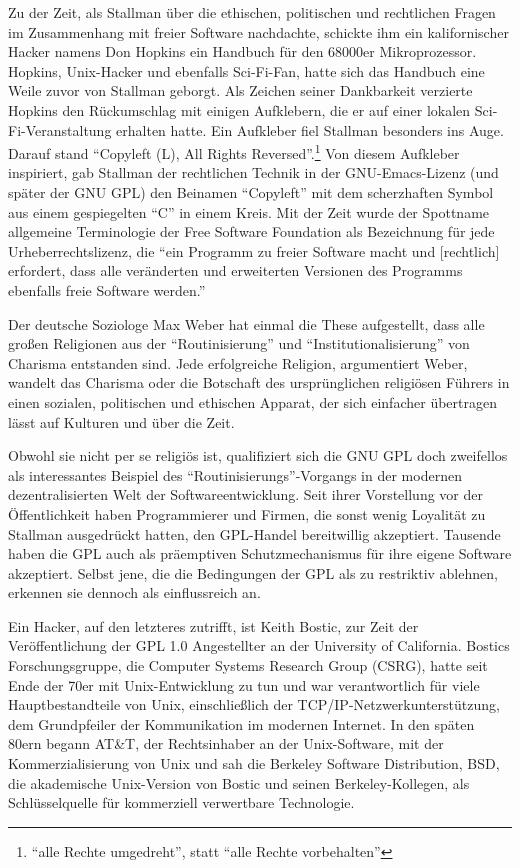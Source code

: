 Zu der Zeit, als Stallman über die ethischen, politischen und rechtlichen Fragen im Zusammenhang mit freier Software nachdachte, schickte ihm ein kalifornischer Hacker namens Don Hopkins ein Handbuch für den 68000er Mikroprozessor. Hopkins, Unix-Hacker und ebenfalls Sci-Fi-Fan, hatte sich das Handbuch eine Weile zuvor von Stallman geborgt. Als Zeichen seiner Dankbarkeit verzierte Hopkins den Rückumschlag mit einigen Aufklebern, die er auf einer lokalen Sci-Fi-Veranstaltung erhalten hatte. Ein Aufkleber fiel Stallman besonders ins Auge. Darauf stand "`Copyleft (L), All Rights Reversed"'.\footnote{"`alle Rechte umgedreht"', statt "`alle Rechte vorbehalten"'} Von diesem Aufkleber inspiriert, gab Stallman der rechtlichen Technik in der GNU-Emacs-Lizenz (und später der GNU GPL) den Beinamen "`Copyleft"' mit dem scherzhaften Symbol aus einem gespiegelten "`C"' in einem Kreis. Mit der Zeit wurde der Spottname allgemeine Terminologie der Free Software Foundation als Bezeichnung für jede Urheberrechtslizenz, die "`ein Programm zu freier Software macht und [rechtlich] erfordert, dass alle veränderten und erweiterten Versionen des Programms ebenfalls freie Software werden."'

Der deutsche Soziologe Max Weber hat einmal die These aufgestellt, dass alle großen Religionen aus der "`Routinisierung"' und "`Institutionalisierung"' von Charisma entstanden sind. Jede erfolgreiche Religion, argumentiert Weber, wandelt das Charisma oder die Botschaft des ursprünglichen religiösen Führers in einen sozialen, politischen und ethischen Apparat, der sich einfacher übertragen lässt auf Kulturen und über die Zeit.

Obwohl sie nicht per se religiös ist, qualifiziert sich die GNU GPL doch zweifellos als interessantes Beispiel des "`Routinisierungs"'-Vorgangs in der modernen dezentralisierten Welt der Softwareentwicklung. Seit ihrer Vorstellung vor der Öffentlichkeit haben Programmierer und Firmen, die sonst wenig Loyalität zu Stallman ausgedrückt hatten, den GPL-Handel bereitwillig akzeptiert. Tausende haben die GPL auch als präemptiven Schutzmechanismus für ihre eigene Software akzeptiert. Selbst jene, die die Bedingungen der GPL als zu restriktiv ablehnen, erkennen sie dennoch als einflussreich an.

Ein Hacker, auf den letzteres zutrifft, ist Keith Bostic, zur Zeit der Veröffentlichung der GPL 1.0 Angestellter an der University of California. Bostics Forschungsgruppe, die Computer Systems Research Group (CSRG), hatte seit Ende der 70er mit Unix-Entwicklung zu tun und war verantwortlich für viele Hauptbestandteile von Unix, einschließlich der TCP/IP-Netzwerkunterstützung, dem Grundpfeiler der Kommunikation im modernen Internet. In den späten 80ern begann AT\&T, der Rechtsinhaber an der Unix-Software, mit der Kommerzialisierung von Unix und sah die Berkeley Software Distribution, BSD, die akademische Unix-Version von Bostic und seinen Berkeley-Kollegen, als Schlüsselquelle für kommerziell verwertbare Technologie.

